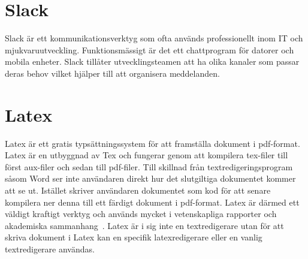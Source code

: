\section{Slack}
Slack är ett kommunikationsverktyg som ofta används professionellt inom IT och mjukvaruutveckling. Funktionsmässigt är det ett chattprogram för datorer och mobila enheter. Slack tillåter utvecklingsteamen att ha olika kanaler som passar deras behov vilket hjälper till att organisera meddelanden.~\cite{Slack}

\section{Latex}
Latex är ett gratis typsättningssystem för att framställa dokument i pdf-format. Latex är en utbyggnad av Tex och fungerar genom att kompilera tex-filer till först aux-filer och sedan till pdf-filer. Till skillnad från textredigeringsprogram såsom Word ser inte användaren direkt hur det slutgiltiga dokumentet kommer att se ut. Istället skriver användaren dokumentet som kod för att senare kompilera ner denna till ett färdigt dokument i pdf-format. Latex är därmed ett väldigt kraftigt verktyg och används mycket i vetenskapliga rapporter och akademiska sammanhang~\cite{ctan}. Latex är i sig inte en textredigerare utan för att skriva dokument i Latex kan en specifik latexredigerare eller en vanlig textredigerare användas.

